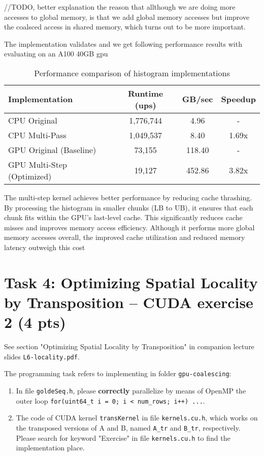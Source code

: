 \documentclass{article}
\begin{document}
//TODO, better explanation
the reason that allthough we are doing more accesses to global memory, 
is that we add global memory accesses but improve the coalsced access in shared memory, which turns out to be more important.



The implementation validates and we get following performance results with evaluating on an A100 40GB gpu

\begin{table}[h]
    \centering
    \begin{tabular}{|l|c|c|c|}
    \hline
    \textbf{Implementation} & \textbf{Runtime (ups)} & \textbf{GB/sec} & \textbf{Speedup} \\
    \hline
    CPU Original & 1,776,744 & 4.96 & - \\
    CPU Multi-Pass & 1,049,537 & 8.40 & 1.69x \\
    GPU Original (Baseline) & 73,155 & 118.40 & - \\
    GPU Multi-Step (Optimized) & 19,127 & 452.86 & 3.82x \\
    \hline
    \end{tabular}
    \caption{Performance comparison of histogram implementations}
    \label{tab:histogram-performance}
    \end{table}


The multi-step kernel achieves better performance by reducing cache thrashing. By processing the histogram in smaller chunks (LB to UB), it ensures that each chunk fits within the GPU's last-level cache. This significantly reduces cache misses and improves memory access efficiency. Although it performs more global memory accesses overall, the improved cache utilization and reduced memory latency outweigh this cost


\section{Task 4: Optimizing Spatial Locality by Transposition -- CUDA exercise 2 (4 pts)}

See section "Optimizing Spatial Locality by Transposition" in companion lecture slides \texttt{L6-locality.pdf}.

The programming task refers to implementing in folder \texttt{gpu-coalescing}: 

\begin{enumerate}
    \item In file \texttt{goldeSeq.h}, please \textbf{correctly} parallelize by means of OpenMP the outer loop \texttt{for(uint64\_t i = 0; i < num\_rows; i++) ...}. 

    \item The code of CUDA kernel \texttt{transKernel} in file \texttt{kernels.cu.h}, which works on the transposed versions of A and B, named \texttt{A\_tr} and \texttt{B\_tr}, respectively. Please search for keyword "Exercise" in file \texttt{kernels.cu.h} to find the implementation place.
\end{enumerate}
\end{document}
